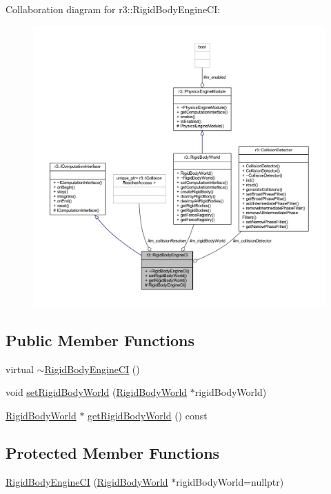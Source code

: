 Collaboration diagram for r3\+:\+:Rigid\+Body\+Engine\+CI\+:\nopagebreak
\begin{figure}[H]
\begin{center}
\leavevmode
\includegraphics[width=350pt]{classr3_1_1_rigid_body_engine_c_i__coll__graph}
\end{center}
\end{figure}
\subsection*{Public Member Functions}
\begin{DoxyCompactItemize}
\item 
virtual \mbox{\hyperlink{classr3_1_1_rigid_body_engine_c_i_a9f75c8c49e987206554b09550d93b341}{$\sim$\+Rigid\+Body\+Engine\+CI}} ()
\item 
void \mbox{\hyperlink{classr3_1_1_rigid_body_engine_c_i_a6787623e1862550ce04f1d970375b0ce}{set\+Rigid\+Body\+World}} (\mbox{\hyperlink{classr3_1_1_rigid_body_world}{Rigid\+Body\+World}} $\ast$rigid\+Body\+World)
\item 
\mbox{\hyperlink{classr3_1_1_rigid_body_world}{Rigid\+Body\+World}} $\ast$ \mbox{\hyperlink{classr3_1_1_rigid_body_engine_c_i_affb7b66f769300619e0c61f7d3ab13ee}{get\+Rigid\+Body\+World}} () const
\end{DoxyCompactItemize}
\subsection*{Protected Member Functions}
\begin{DoxyCompactItemize}
\item 
\mbox{\hyperlink{classr3_1_1_rigid_body_engine_c_i_a10d9cbc84de1412abd7798f638831a35}{Rigid\+Body\+Engine\+CI}} (\mbox{\hyperlink{classr3_1_1_rigid_body_world}{Rigid\+Body\+World}} $\ast$rigid\+Body\+World=nullptr)
\end{DoxyCompactItemize}
